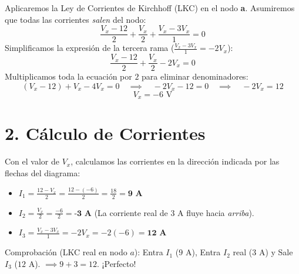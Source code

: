 \documentclass[12pt, a4paper]{article}
\begin{document}
Aplicaremos la Ley de Corrientes de Kirchhoff (LKC) en el nodo \textbf{a}. Asumiremos que todas las corrientes \textit{salen} del nodo:
\begin{equation}
    \frac{V_x - 12}{2} + \frac{V_x}{2} + \frac{V_x - 3V_x}{1} = 0
\end{equation}
Simplificamos la expresión de la tercera rama ($\frac{V_x - 3V_x}{1} = -2V_x$):
\begin{equation*}
    \frac{V_x - 12}{2} + \frac{V_x}{2} - 2V_x = 0
\end{equation*}
Multiplicamos toda la ecuación por $2$ para eliminar denominadores:
\begin{equation*}
    (V_x - 12) + V_x - 4V_x = 0 \quad \implies \quad -2V_x - 12 = 0 \quad \implies \quad -2V_x = 12
\end{equation*}
\begin{equation}
    V_x = -6\text{ V}
\end{equation}

\section*{2. Cálculo de Corrientes}
Con el valor de $V_x$, calculamos las corrientes en la dirección indicada por las flechas del diagrama:
\begin{itemize}
    \item $I_1 = \frac{12 - V_x}{2} = \frac{12 - (-6)}{2} = \frac{18}{2} = \textbf{9 A}$
    \item $I_2 = \frac{V_x}{2} = \frac{-6}{2} = \textbf{-3 A}$ \quad (La corriente real de $3\text{ A}$ fluye hacia \textit{arriba}).
    \item $I_3 = \frac{V_x - 3V_x}{1} = -2V_x = -2(-6) = \textbf{12 A}$ 
\end{itemize}
Comprobación (LKC real en nodo $a$): Entra $I_1$ ($9\text{ A}$), Entra $I_2$ real ($3\text{ A}$) y Sale $I_3$ ($12\text{ A}$). $\implies 9 + 3 = 12$. ¡Perfecto!
\end{document}

